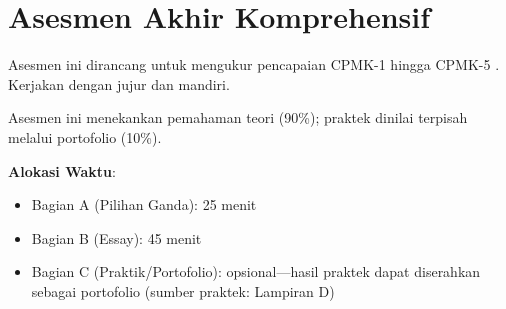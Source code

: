 \section{Asesmen Akhir Komprehensif}

Asesmen ini dirancang untuk mengukur pencapaian CPMK-1 hingga CPMK-5 \cite{unityRollABall}. Kerjakan dengan jujur dan mandiri.

Asesmen ini menekankan pemahaman teori (90\%); praktek dinilai terpisah melalui portofolio (10\%).

\textbf{Alokasi Waktu}:
\begin{itemize}
  \item Bagian A (Pilihan Ganda): 25 menit
  \item Bagian B (Essay): 45 menit
  \item Bagian C (Praktik/Portofolio): opsional---hasil praktek dapat diserahkan sebagai portofolio (sumber praktek: Lampiran D)
\end{itemize}
